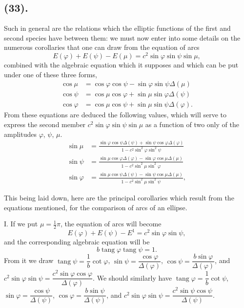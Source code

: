 \documentclass{article}
\begin{document}
\subsection*{(33).}

Such in general are the relations which the elliptic functions of the first and second species have between them: we must now enter into some details on the numerous corollaries that one can draw from the equation of arcs
\[ E(\varphi)+E(\psi)-E(\mu)=c^{2}\sin\varphi\sin\psi\sin\mu, \]
combined with the algebraic equation which it supposes and which can be put under one of these three forms,
\[ \begin{aligned} \cos\mu &= \cos\varphi\cos\psi-\sin\varphi\sin\psi\Delta(\mu) \\ \cos\psi &= \cos\mu\cos\varphi+\sin\mu\sin\varphi\Delta(\psi) \\ \cos\varphi &= \cos\mu\cos\psi+\sin\mu\sin\psi\Delta(\varphi). \end{aligned} \]
From these equations are deduced the following values, which will serve to express the second member $c^{2}\sin\varphi\sin\psi\sin\mu$ as a function of two only of the amplitudes $\varphi$, $\psi$, $\mu$.
\[ \begin{aligned} \sin\mu &= \frac{\sin\varphi\cos\psi\Delta(\psi)+\sin\psi\cos\varphi\Delta(\varphi)}{1-c^{2}\sin^{2}\varphi\sin^{2}\psi} \\ \sin\psi &= \frac{\sin\mu\cos\varphi\Delta(\varphi)-\sin\varphi\cos\mu\Delta(\mu)}{1-c^{2}\sin^{2}\mu\sin^{2}\varphi} \\ \sin\varphi &= \frac{\sin\mu\cos\psi\Delta(\psi)-\sin\psi\cos\mu\Delta(\mu)}{1-c^{2}\sin^{2}\mu\sin^{2}\psi}, \end{aligned} \]


This being laid down, here are the principal corollaries which result from the equations mentioned, for the comparison of arcs of an ellipse.

I. If we put $\mu=\frac{1}{2}\pi$, the equation of arcs will become
\[ E(\varphi)+E(\psi)-E^{1}=c^{2}\sin\varphi\sin\psi, \]
and the corresponding algebraic equation will be
\[ b\operatorname{tang}\varphi\operatorname{tang}\psi=1. \]
From it we draw $\operatorname{tang}\psi=\dfrac{1}{b}\cot\varphi$, $\sin\psi=\dfrac{\cos\varphi}{\Delta(\varphi)}$, $\cos\psi=\dfrac{b\sin\varphi}{\Delta(\varphi)}$, and $c^{2}\sin\varphi\sin\psi=\dfrac{c^{2}\sin\varphi\cos\varphi}{\Delta(\varphi)}$. We should similarly have $\operatorname{tang}\varphi=\dfrac{1}{b}\cot\psi$, $\sin\varphi=\dfrac{\cos\psi}{\Delta(\psi)}$, $\cos\varphi=\dfrac{b\sin\psi}{\Delta(\psi)}$, and $c^{2}\sin\varphi\sin\psi=\dfrac{c^{2}\sin\psi\cos\psi}{\Delta(\psi)}$.
\end{document}
